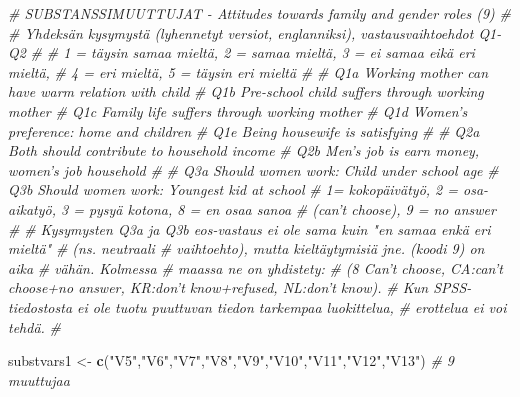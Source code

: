 \documentclass[
  finnish,
]{book}
\newenvironment{Shaded}{\begin{snugshade}}{\end{snugshade}}
\newcommand{\CommentTok}[1]{\textcolor[rgb]{0.56,0.35,0.01}{\textit{#1}}}
\newcommand{\KeywordTok}[1]{\textcolor[rgb]{0.13,0.29,0.53}{\textbf{#1}}}
\newcommand{\NormalTok}[1]{#1}
\newcommand{\StringTok}[1]{\textcolor[rgb]{0.31,0.60,0.02}{#1}}
\begin{document}
\begin{Shaded}
\begin{Highlighting}[]
{\CommentTok{# SUBSTANSSIMUUTTUJAT - Attitudes towards family and gender roles (9)}
\CommentTok{#}
\CommentTok{# Yhdeksän kysymystä (lyhennetyt versiot, englanniksi), vastausvaihtoehdot Q1-Q2}
\CommentTok{#}
\CommentTok{# 1 = täysin samaa mieltä, 2 = samaa mieltä, 3 = ei samaa eikä eri mieltä, }
\CommentTok{# 4 = eri mieltä, 5 = täysin eri mieltä}
\CommentTok{# }
\CommentTok{# Q1a Working mother can have warm relation with child}
\CommentTok{# Q1b Pre-school child suffers through working mother}
\CommentTok{# Q1c Family life suffers through working mother}
\CommentTok{# Q1d Women’s preference: home and children}
\CommentTok{# Q1e Being housewife is satisfying}
\CommentTok{#}
\CommentTok{# Q2a Both should contribute to household income}
\CommentTok{# Q2b Men’s job is earn money, women’s job household}
\CommentTok{#}
\CommentTok{# Q3a Should women work: Child under school age }
\CommentTok{# Q3b Should women work: Youngest kid at school}
\CommentTok{# 1= kokopäivätyö, 2 = osa-aikatyö, 3 = pysyä kotona, 8 = en osaa sanoa}
\CommentTok{# (can't choose), 9 = no answer}
\CommentTok{#}
\CommentTok{# Kysymysten Q3a ja Q3b eos-vastaus ei ole sama kuin "en samaa enkä eri  mieltä"}
\CommentTok{# (ns. neutraali # vaihtoehto), mutta kieltäytymisiä jne. (koodi 9) on aika}
\CommentTok{# vähän. Kolmessa # maassa ne on yhdistety: }
\CommentTok{# (8 Can't choose, CA:can't choose+no answer, KR:don't know+refused, NL:don't know).}
\CommentTok{# Kun SPSS-tiedostosta ei ole tuotu puuttuvan tiedon tarkempaa luokittelua,}
\CommentTok{# erottelua ei voi tehdä.}
\CommentTok{#}

\NormalTok{substvars1 <-}\StringTok{ }\KeywordTok{c}\NormalTok{(}\StringTok{"V5"}\NormalTok{,}\StringTok{"V6"}\NormalTok{,}\StringTok{"V7"}\NormalTok{,}\StringTok{"V8"}\NormalTok{,}\StringTok{"V9"}\NormalTok{,}\StringTok{"V10"}\NormalTok{,}\StringTok{"V11"}\NormalTok{,}\StringTok{"V12"}\NormalTok{,}\StringTok{"V13"}\NormalTok{) }\CommentTok{# 9 muuttujaa}

}
\end{Highlighting}
\end{Shaded}
\end{document}
